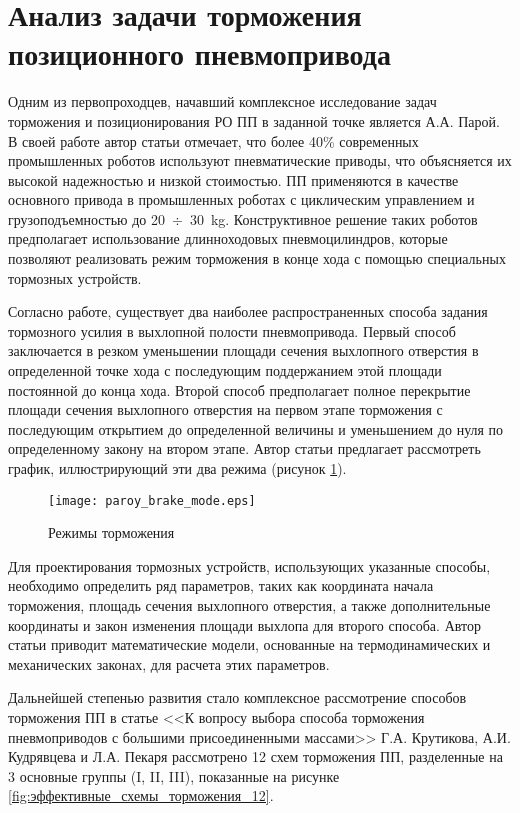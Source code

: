 
\section{Анализ задачи торможения позиционного пневмопривода}\label{sec:ch1/sec4}

Одним из первопроходцев, начавший комплексное исследование задач торможения и позиционирования
РО ПП в заданной точке является А.А. Парой. В своей работе \cite*{парой:способы_торможения} автор статьи отмечает,
что более 40\%
современных промышленных роботов используют пневматические приводы, что объясняется их высокой надежностью и
низкой стоимостью. ПП применяются в качестве основного привода в промышленных роботах с
циклическим управлением и грузоподъемностью до 20~$\div$~30~\si{\kilogram}. Конструктивное решение таких роботов
предполагает использование длинноходовых пневмоцилиндров, которые позволяют реализовать режим
торможения в конце хода с помощью специальных тормозных устройств.

Согласно работе, существует два наиболее распространенных способа задания
тормозного усилия в выхлопной полости пневмопривода. Первый способ заключается в
резком уменьшении площади сечения выхлопного отверстия в определенной точке хода с
последующим поддержанием этой площади постоянной до конца хода. Второй способ предполагает
полное перекрытие площади сечения выхлопного отверстия на первом этапе торможения с последующим
открытием до определенной величины и уменьшением до нуля по определенному закону на втором этапе.
Автор статьи предлагает рассмотреть график, иллюстрирующий эти два режима (рисунок \cref*{fig:парой_режимы_торможения}).

\begin{figure}[h]
    \centerfloat
    \texttt{[image: paroy\_brake\_mode.eps]}
    \caption{Режимы торможения}\label{fig:парой_режимы_торможения}
\end{figure}

Для проектирования тормозных устройств, использующих указанные способы, необходимо определить ряд
параметров, таких как координата начала торможения, площадь сечения выхлопного отверстия,
а также дополнительные координаты и закон изменения площади выхлопа для второго способа.
Автор статьи приводит математические модели, основанные на термодинамических и механических законах,
для расчета этих параметров.

Дальнейшей степенью развития стало комплексное рассмотрение способов торможения ПП в статье <<К вопросу выбора способа торможения
пневмоприводов с большими присоединенными массами>> Г.А. Крутикова, А.И. Кудрявцева и Л.А. Пекаря \cite*{крутиков:способы_торможения_12}
рассмотрено 12 схем торможения ПП, разделенные на 3 основные группы (I, II, III), показанные на рисунке \cref*{fig:эффективные_схемы_торможения_12}.

